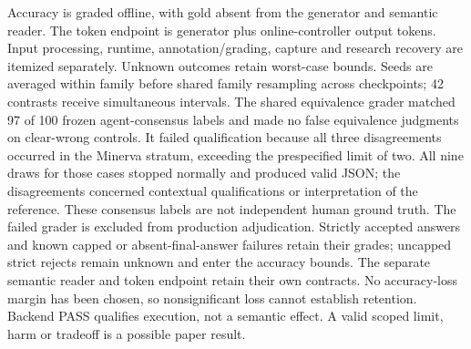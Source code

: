 Accuracy is graded offline, with gold absent from the generator and
semantic reader. The token endpoint is generator plus online-controller
output tokens. Input processing, runtime, annotation/grading, capture and
research recovery are itemized separately. Unknown outcomes retain
worst-case bounds. Seeds are averaged within family before shared family
resampling across checkpoints; 42 contrasts receive simultaneous intervals.
The shared equivalence grader matched 97 of 100 frozen agent-consensus
labels and made no false equivalence judgments on clear-wrong controls.
It failed qualification because all three disagreements occurred in the
Minerva stratum, exceeding the prespecified limit of two. All nine draws
for those cases stopped normally and produced valid JSON; the disagreements
concerned contextual qualifications or interpretation of the reference.
These consensus labels are not independent human ground truth. The failed
grader is excluded from production adjudication. Strictly accepted answers
and known capped or absent-final-answer failures retain their grades;
uncapped strict rejects remain unknown and enter the accuracy bounds.
The separate semantic reader and token endpoint retain their own contracts.
No accuracy-loss margin has been chosen, so nonsignificant loss cannot
establish retention. Backend PASS qualifies execution, not a semantic
effect. A valid scoped limit, harm or tradeoff is a possible paper result.


